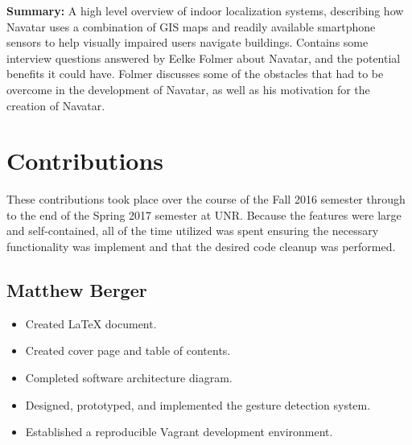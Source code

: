 \documentclass{scrreprt}
\begin{document}
\textbf{Summary:}
 A high level overview of indoor localization systems, describing how Navatar uses a combination of GIS maps and readily available smartphone sensors to help visually impaired users navigate buildings. Contains some interview questions answered by Eelke Folmer about Navatar, and the potential benefits it could have. Folmer discusses some of the obstacles that had to be overcome in the development of Navatar, as well as his motivation for the creation of Navatar.


\chapter{Contributions}
\begin{highlightbox}These contributions took place over the course of the Fall 2016 semester through to the end of the Spring 2017 semester at UNR. Because the features were large and self-contained, all of the time utilized was spent ensuring the necessary functionality was implement and that the desired code cleanup was performed.\end{highlightbox}
	\section{Matthew Berger}
		\begin{itemize}
			\item Created LaTeX document.
			\item Created cover page and table of contents.
			\item Completed software architecture diagram.
			\item \begin{highlightbox} Designed, prototyped, and implemented the gesture detection system.
			\end{highlightbox}
			\item \begin{highlightbox} Established a reproducible Vagrant development environment.
			\end{highlightbox}
		\end{itemize}
\end{document}

